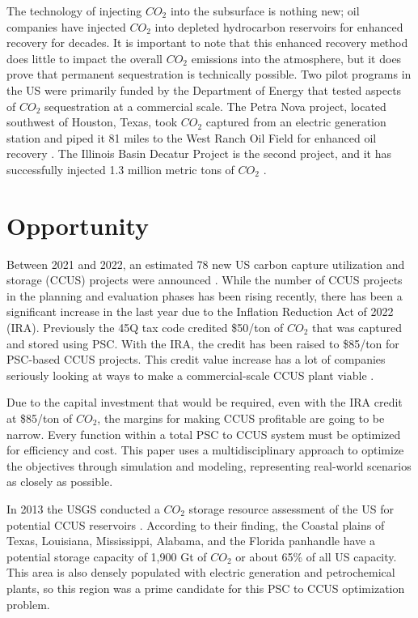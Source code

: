 \documentclass[balance,upint,subscriptcorrection,varvw,mathalfa=cal=boondoxo,spanish,french,vietnamese,russian,greek,pdf-a,colorlinks]{asmeconf}
\begin{document}
The technology of injecting $CO_{2}$ into the subsurface is nothing new; oil companies have injected $CO_{2}$ into depleted hydrocarbon reservoirs for enhanced recovery for decades. It is important to note that this enhanced recovery method does little to impact the overall $CO_{2}$ emissions into the atmosphere, but it does prove that permanent sequestration is technically possible. Two pilot programs in the US were primarily funded by the Department of Energy that tested aspects of $CO_{2}$ sequestration at a commercial scale. The Petra Nova project, located southwest of Houston, Texas, took $CO_{2}$ captured from an electric generation station and piped it 81 miles to the West Ranch Oil Field for enhanced oil recovery \cite{Smyth2020}. The Illinois Basin Decatur Project is the second project, and it has successfully injected 1.3 million metric tons of $CO_{2}$ \cite{IBDP2017}.

\section{Opportunity}
Between 2021 and 2022, an estimated 78 new US carbon capture utilization and storage (CCUS) projects were announced \cite{CCSProjects2023}. While the number of CCUS projects in the planning and evaluation phases has been rising recently, there has been a significant increase in the last year due to the Inflation Reduction Act of 2022 (IRA). Previously the 45Q tax code credited \$50/ton of $CO_{2}$ that was captured and stored using PSC. With the IRA, the credit has been raised to \$85/ton for PSC-based CCUS projects. This credit value increase has a lot of companies seriously looking at ways to make a commercial-scale CCUS plant viable \cite{IRA2022}. 

Due to the capital investment that would be required, even with the IRA credit at \$85/ton of $CO_{2}$, the margins for making CCUS profitable are going to be narrow. Every function within a total PSC to CCUS system must be optimized for efficiency and cost. This paper uses a multidisciplinary approach to optimize the objectives through simulation and modeling, representing real-world scenarios as closely as possible. 

In 2013 the USGS conducted a $CO_{2}$ storage resource assessment of the US for potential CCUS reservoirs \cite{USGS2013}. According to their finding, the Coastal plains of Texas, Louisiana, Mississippi, Alabama, and the Florida panhandle have a potential storage capacity of 1,900 Gt of $CO_{2}$ or about 65\% of all US capacity. This area is also densely populated with electric generation and petrochemical plants, so this region was a prime candidate for this PSC to CCUS optimization problem.
\end{document}
